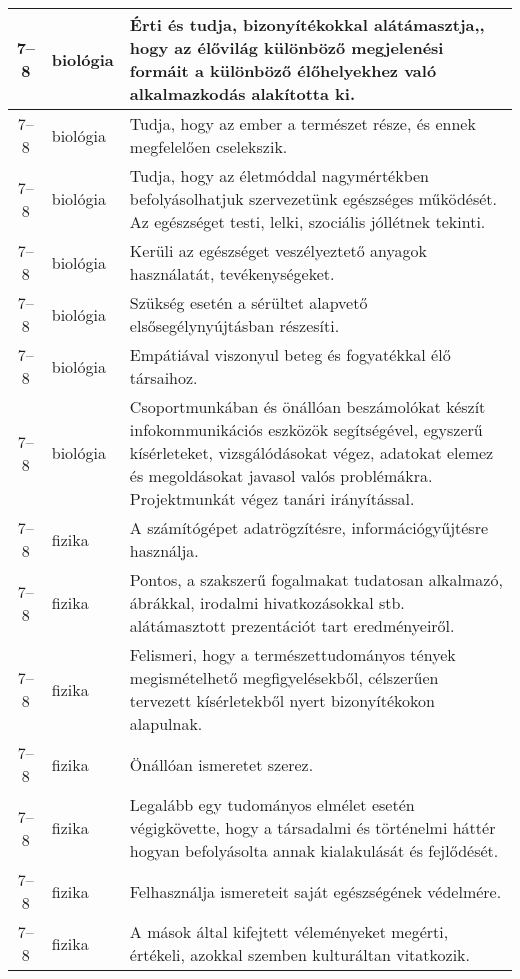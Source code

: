 \begin{small}
\begin{longtable}{c | p{2cm} |  p{11cm} }
              7--8 & biológia & Érti és tudja, bizonyítékokkal alátámasztja,, hogy az élővilág különböző megjelenési formáit a különböző élőhelyekhez való alkalmazkodás alakította ki. \\ \hline
              7--8 & biológia & Tudja, hogy az ember a természet része, és ennek megfelelően cselekszik. \\ \hline
              7--8 & biológia & Tudja, hogy az életmóddal nagymértékben befolyásolhatjuk szervezetünk egészséges működését. Az egészséget testi, lelki, szociális jóllétnek tekinti. \\ \hline
              7--8 & biológia & Kerüli az egészséget veszélyeztető anyagok használatát, tevékenységeket. \\ \hline
              7--8 & biológia & Szükség esetén a sérültet alapvető elsősegélynyújtásban részesíti. \\ \hline
              7--8 & biológia & Empátiával viszonyul beteg és fogyatékkal élő társaihoz. \\ \hline
              7--8 & biológia & Csoportmunkában és önállóan beszámolókat készít infokommunikációs eszközök segítségével, egyszerű kísérleteket, vizsgálódásokat végez, adatokat elemez és megoldásokat javasol valós problémákra. Projektmunkát végez tanári irányítással. \\ \hline
              7--8 & fizika & A számítógépet adatrögzítésre, információgyűjtésre használja. \\ \hline
              7--8 & fizika & Pontos, a szakszerű fogalmakat tudatosan alkalmazó, ábrákkal, irodalmi hivatkozásokkal stb. alátámasztott prezentációt tart eredményeiről. \\ \hline
              7--8 & fizika & Felismeri, hogy a természettudományos tények megismételhető megfigyelésekből, célszerűen tervezett kísérletekből nyert bizonyítékokon alapulnak. \\ \hline
              7--8 & fizika & Önállóan ismeretet szerez. \\ \hline
              7--8 & fizika & Legalább egy tudományos elmélet esetén végigkövette, hogy a társadalmi és történelmi háttér hogyan befolyásolta annak kialakulását és fejlődését. \\ \hline
              7--8 & fizika & Felhasználja ismereteit saját egészségének védelmére. \\ \hline
              7--8 & fizika & A mások által kifejtett véleményeket megérti, értékeli, azokkal szemben kulturáltan vitatkozik. \\ \hline

\end{longtable}
\end{small}
